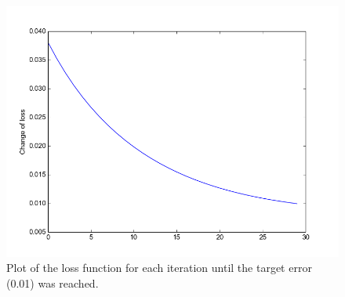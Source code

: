 \documentclass{article}
\begin{document}
\begin{figure}[H]
  \centering
  \includegraphics[width=1.0\textwidth]{figures/plot.png}
  \caption{Plot of the loss function for each iteration until the target error (0.01) was reached.}
  \label{fig:plot}
\end{figure}

\end{document}
